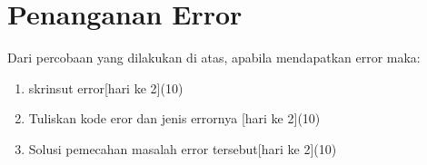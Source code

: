 \section{Penanganan Error}
Dari percobaan yang dilakukan di atas, apabila mendapatkan error maka:

\begin{enumerate}
	\item
	skrinsut error[hari ke 2](10)
	\item
Tuliskan kode eror dan jenis errornya [hari ke 2](10)
	\item
Solusi pemecahan masalah error tersebut[hari ke 2](10)

\end{enumerate}

